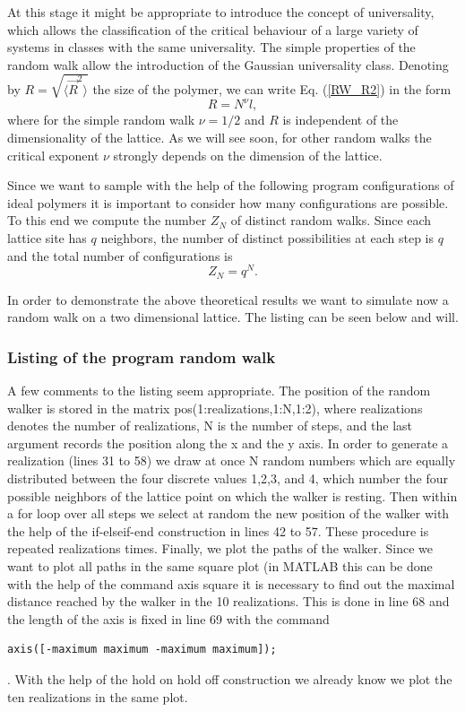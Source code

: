 At this stage it might be appropriate to introduce the concept of 
universality, which allows the classification of the critical 
behaviour of a large variety of systems in classes with the same 
universality. The simple properties of the random walk allow the 
introduction of the Gaussian universality class. Denoting by
$R = \sqrt{\langle \vec{R}^2\rangle}$ the size of the polymer, we 
can write  Eq. (\ref{RW_R2}) in the form
\begin{equation*}
R = N^{\nu}l,
\end{equation*}
where for the simple random walk $\nu = 1/2$ and $R$ is independent of 
the dimensionality of the lattice. As we will see soon, for other 
random walks the critical exponent $\nu$ strongly depends on the 
dimension of the lattice.

Since we want to sample with the help of the following program
configurations of ideal polymers it is important to consider how 
many configurations are possible. To this end we compute the 
number $Z_N$ of distinct random walks. Since each lattice site 
has $q$ neighbors,
the number of distinct possibilities at each step is $q$ and the 
total number of configurations is
\begin{equation}
\label{Z_NRW}
Z_N = q^N.
\end{equation}

In order to demonstrate the above theoretical results we want to 
simulate now a random walk on a two dimensional lattice.
The listing can be seen below and will.

\subsubsection{Listing of the program random walk}

A few comments to the listing seem appropriate. 
The position of the random walker is stored in the matrix
{\sf pos(1:realizations,1:N,1:2)}, where {\sf realizations} denotes
the number of realizations, {\sf N} is the number of steps, and 
the last argument records the position along the x and the y axis.
In order to generate a realization (lines 31 to 58) we draw at 
once N random numbers which are equally distributed between the 
four discrete values 1,2,3, and 4, which number the four
possible neighbors of the lattice point on which the walker is 
resting. Then within a for loop over all steps 
we select at random the new position of the walker
with the help of the if-elseif-end construction in lines
42 to 57. These procedure is repeated {\sf realizations} times.
Finally, we plot the paths of the walker. Since we want to plot 
all paths in the same square plot (in MATLAB this can be done
with the help of the command {\sf axis square} it is necessary to find out
the maximal distance reached by the walker in the 10 realizations.
This is done in line 68 and the length of the axis is fixed in 
line 69 with the command
\begin{verbatim}
axis([-maximum maximum -maximum maximum]);
\end{verbatim}. 
With the help of the {\sf hold on} {\sf hold off} construction we 
already know we plot the ten realizations in the same plot.

